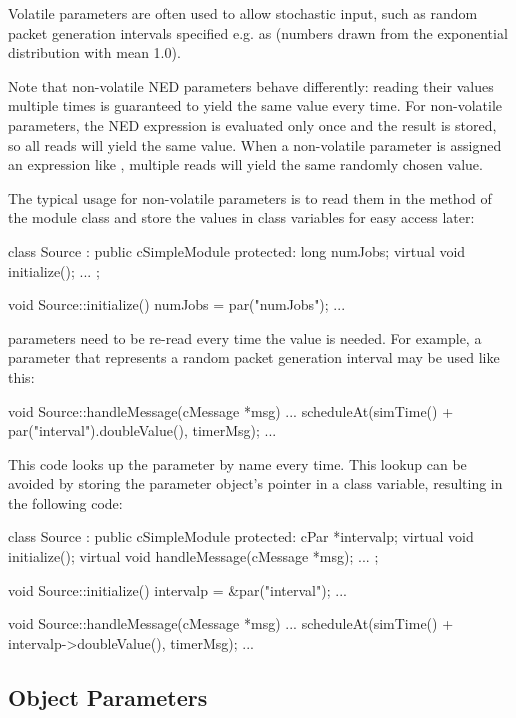 Volatile parameters are often used to allow stochastic input, such as random
packet generation intervals specified e.g. as  (numbers
drawn from the exponential distribution with mean 1.0).

Note that non-volatile NED parameters behave differently: reading their values
multiple times is guaranteed to yield the same value every time. For
non-volatile parameters, the NED expression is evaluated only once and the
result is stored, so all reads will yield the same value. When a non-volatile
parameter is assigned an expression like , multiple reads
will yield the same randomly chosen value.

The typical usage for non-volatile parameters is to read them in the
 method of the module class and store the values in class
variables for easy access later:

\begin{cpp}
class Source : public cSimpleModule
{
  protected:
    long numJobs;
    virtual void initialize();
    ...
};

void Source::initialize()
{
    numJobs = par("numJobs");
    ...
}
\end{cpp}

 parameters need to be re-read every time the value is needed. For
example, a parameter that represents a random packet generation interval may be
used like this:

\begin{cpp}
void Source::handleMessage(cMessage *msg)
{
    ...
    scheduleAt(simTime() + par("interval").doubleValue(), timerMsg);
    ...
}
\end{cpp}

This code looks up the parameter by name every time. This lookup can be avoided
by storing the parameter object's pointer in a class variable, resulting in the
following code:

\begin{cpp}
class Source : public cSimpleModule
{
  protected:
    cPar *intervalp;
    virtual void initialize();
    virtual void handleMessage(cMessage *msg);
    ...
};

void Source::initialize()
{
    intervalp = &par("interval");
    ...
}

void Source::handleMessage(cMessage *msg)
{
    ...
    scheduleAt(simTime() + intervalp->doubleValue(), timerMsg);
    ...
}
\end{cpp}


\subsection{Object Parameters}
\label{sec:simple-modules:object-parameters}

